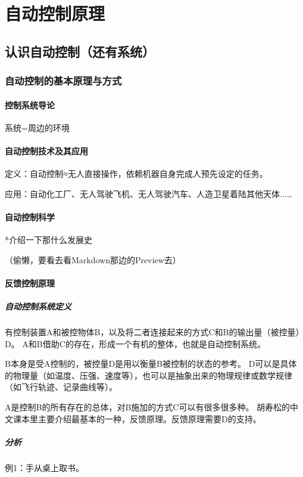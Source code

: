 \documentclass{NHNotebook}
\begin{document}
\part{自动控制原理}
\chapter{认识自动控制（还有系统）}

\section{自动控制的基本原理与方式}
\subsection{控制系统导论}
系统=周边的环境
\subsection{自动控制技术及其应用}
定义：自动控制≈无人直接操作，依赖机器自身完成人预先设定的任务。

应用：自动化工厂、无人驾驶飞机、无人驾驶汽车、人造卫星着陆其他天体...\dots
\subsection{自动控制科学}
*介绍一下那什么发展史

（偷懒，要看去看Markdown那边的Preview去）

\subsection{反馈控制原理}
\subsubsection{自动控制系统定义}
有控制装置A和被控物体B，以及将二者连接起来的方式C和B的输出量（被控量）D。
A和B借助C的存在，形成一个有机的整体，也就是自动控制系统。

B本身是受A控制的，被控量D是用以衡量B被控制的状态的参考。
D可以是具体的物理量（如温度、压强、速度等），也可以是抽象出来的物理规律或数学规律（如飞行轨迹、记录曲线等）。

A是控制B的所有存在的总体，对B施加的方式C可以有很多很多种。
胡寿松的中文课本里主要介绍最基本的一种，反馈原理。反馈原理需要D的支持。
\subsubsection{分析}
例1：手从桌上取书。
\end{document}
